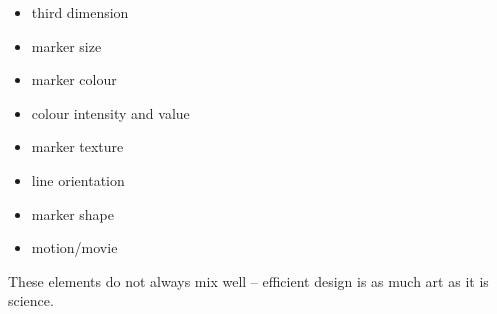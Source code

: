 \begin{itemize}[noitemsep]
\item third dimension
\item marker size
\item marker colour
\item colour intensity and value 
\item marker texture
\item line orientation
\item marker shape
\item motion/movie
\end{itemize} These elements do not always mix well -- efficient design is as much art as it is science. 
